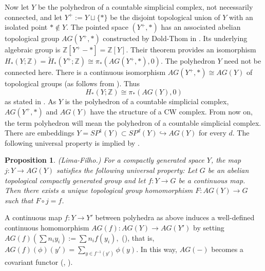 \documentclass{amsart}
\newtheorem{prop}[thm]{Proposition}
\theoremstyle{definition}
\theoremstyle{remark}
\newcommand {\intg}  {\ensuremath{\mathbb{Z}}}
\begin{document}
Now let $Y$ be the polyhedron of a countable simplicial
complex, not necessarily connected, and
let $Y^+ := Y \sqcup \{ * \}$
be the disjoint topological union of $Y$ with an isolated point $* \not\in Y$.
The pointed space $(Y^+,*)$ has an associated abelian topological group
$AG (Y^+,*)$
constructed by Dold-Thom in \cite{doldthom}. 
Its underlying algebraic group is $\intg [Y^+ - *] = \intg [Y]$.
Their theorem \cite[p. 274, Satz 6.10 I for $Y$]{doldthom} provides an isomorphism 
$H_* (Y;\intg) = \widetilde{H}_* (Y^+;\intg) \cong
   \pi_* (AG(Y^+, *), 0).$
The polyhedron $Y$ need not be connected here.
There is a continuous isomorphism $AG (Y^+ ,*) \cong AG (Y)$
of topological groups (as follows from 
\cite[p. 570 b; and p. 571, Lemma 2.2 a]{limafilhogspaces}). Thus
\[ H_* (Y;\intg) \cong \pi_* (AG(Y),0) \]
as stated in \cite{gajer}.
As $Y$ is the polyhedron of a countable simplicial complex,
$AG(Y^+,*)$ and $AG(Y)$ have the structure of a CW complex.
From now on, the term polyhedron will mean the polyhedron of a 
countable simplicial complex.
There are embeddings $Y=SP^1 (Y) \subset SP^d (Y) \hookrightarrow AG (Y)$
for every $d$. The following universal property is implied by
\cite[p. 570, d]{limafilhogspaces}.

\begin{prop} \label{prop.markovuniversal}
(Lima-Filho.)
For a compactly generated space $Y$, 
the map $j: Y \to AG (Y)$ satisfies the following
universal property: 
Let $G$ be an abelian topological compactly generated group
and let $f:Y \to G$ be a continuous map. Then there exists a unique
topological group homomorphism $F: AG (Y) \to G$ such that $F \circ j =f$.
\end{prop}

A continuous map $f:Y \to Y'$ between polyhedra as above induces
a well-defined continuous homomorphism
$AG(f): AG(Y) \to AG(Y')$
by setting
$AG(f)(\sum n_i y_i) := \sum n_i f(y_i),$
(\cite[p. 961]{gajer}), that is, 
$AG(f)(\phi)(y') = \sum_{y\in f^{-1} (y')} \phi (y).$
In this way, $AG (-)$ becomes a covariant functor
(\cite[p. 570, Properties 2.1 a]{limafilhogspaces},
\cite[6.6]{mccord}).\\
\end{document}
